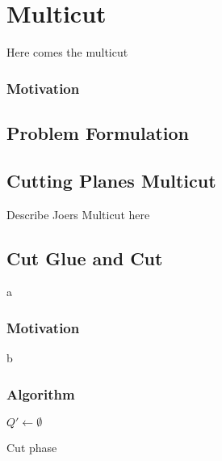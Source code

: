 
\chapter{Multicut}\label{ch:multicut} 
Here comes the multicut

\subsection{Motivation}\label{sec:mc_motivation}

\section{Problem Formulation}\label{sec:mc_problem_formulation}

\section{Cutting Planes Multicut}\label{sec:cp_multicut}

Describe Joers Multicut here

\section{Cut Glue and Cut}
a
\subsection{Motivation}
b
\subsection{Algorithm}

    \begin{algorithm}
        \ifx\DontPrintSemicolon\undefined
        \else
        \DontPrintSemicolon
        \fi
        $Q' \leftarrow \emptyset$\;
        \caption{Cut phase\label{alg:cut_phase}}

    \end{algorithm}


